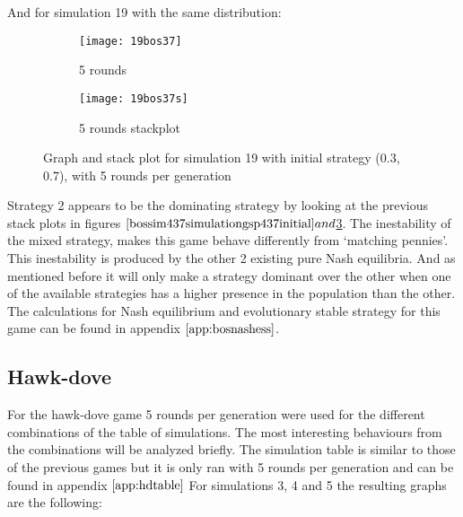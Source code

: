 And for simulation 19 with the same distribution:
\begin{figure}[H]       
    \centering
    \begin{subfigure}[b]{0.3\textwidth}
	\centering
	{\texttt{[image: 19bos37]}}   
    	\caption{5 rounds}
	\label{fig:bossim1937}
    \end{subfigure}
    \hfill
    \begin{subfigure}[b]{0.3\textwidth}
	\centering
	{\texttt{[image: 19bos37s]}}   
    	\caption{5 rounds stackplot}
	\label{fig:bossim1937s}
    \end{subfigure}
    \caption{Graph and stack plot for simulation 19 with initial strategy (0.3, 0.7), with 5 rounds per generation}
    \label{bossim1937simulationgsp1937initial}
\end{figure}
Strategy 2 appears to be the dominating strategy by looking at the previous stack plots in figures $\ref{bossim437simulationgsp437initial} and $\ref{bossim1937simulationgsp1937initial}. The inestability of the mixed strategy, makes this game behave differently from `matching pennies'. This inestability is produced by the other 2 existing pure Nash equilibria. And as mentioned before it will only make a strategy dominant over the other when one of the available strategies has a higher presence in the population than the other. 
The calculations for Nash equilibrium and evolutionary stable strategy for this game can be found in appendix $\ref{app:bosnashess}$.






\subsection{Hawk-dove}
For the hawk-dove game 5 rounds per generation were used for the different combinations of the table of simulations. The most interesting behaviours from the combinations will be analyzed briefly. The simulation table is similar to those of the previous games but it is only ran with 5 rounds per generation and can be found in appendix $\ref{app:hdtable}$
For simulations 3, 4 and 5 the resulting graphs are the following:


